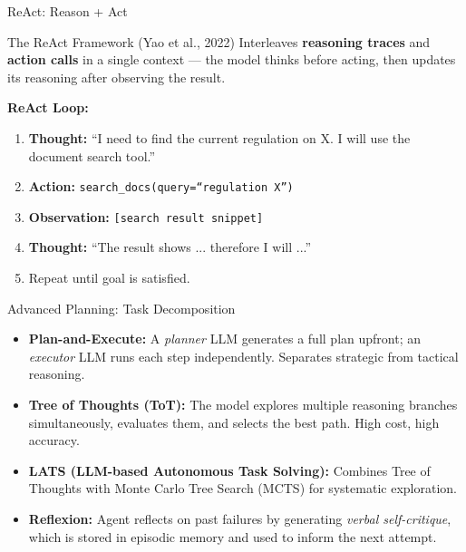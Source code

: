 \documentclass{beamer}       %
\begin{document}
\begin{frame}{ReAct: Reason + Act}
    \begin{block}{The ReAct Framework (Yao et al., 2022)}
        Interleaves \textbf{reasoning traces} and \textbf{action calls} in a single context --- the model thinks before acting, then updates its reasoning after observing the result.
    \end{block}
    \vspace{0.2cm}
    \textbf{ReAct Loop:}
    \begin{enumerate}
        \item \textbf{Thought:} ``I need to find the current regulation on X. I will use the document search tool.''
        \item \textbf{Action:} \texttt{search\_docs(query=``regulation X'')}
        \item \textbf{Observation:} \texttt{[search result snippet]}
        \item \textbf{Thought:} ``The result shows ... therefore I will ...''
        \item Repeat until goal is satisfied.
    \end{enumerate}
\end{frame}

\begin{frame}{Advanced Planning: Task Decomposition}
    \begin{itemize}
        \item \textbf{Plan-and-Execute:} A \emph{planner} LLM generates a full plan upfront; an \emph{executor} LLM runs each step independently. Separates strategic from tactical reasoning.
        \item \textbf{Tree of Thoughts (ToT):} The model explores multiple reasoning branches simultaneously, evaluates them, and selects the best path. High cost, high accuracy.
        \item \textbf{LATS (LLM-based Autonomous Task Solving):} Combines Tree of Thoughts with Monte Carlo Tree Search (MCTS) for systematic exploration.
        \item \textbf{Reflexion:} Agent reflects on past failures by generating \emph{verbal self-critique}, which is stored in episodic memory and used to inform the next attempt.
    \end{itemize}
\end{frame}
\end{document}
